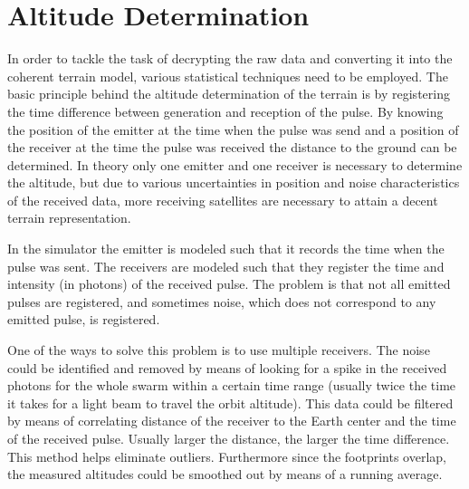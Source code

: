 \section{Altitude Determination}
\label{altDet}
In order to tackle the task of decrypting the raw data and converting it into the coherent terrain model, various statistical techniques need to be employed. The basic principle behind the altitude determination of the terrain is by registering the time difference between generation and reception of the pulse. By knowing the position of the emitter at the time when the pulse was send and a position of the receiver at the time the pulse was received the distance to the ground can be determined. In theory only one emitter and one receiver is necessary to determine the altitude, but due to various uncertainties in position and noise characteristics of the received data, more receiving satellites are necessary to attain a decent terrain representation. 

In the simulator the emitter is modeled such that it records the time when the pulse was sent. The receivers are modeled such that they register the time and intensity (in photons) of the received pulse. The problem is that not all emitted pulses are registered, and sometimes noise, which does not correspond to any emitted pulse, is registered. 

One of the ways to solve this problem is to use multiple receivers. The noise could be identified and removed by means of looking for a spike in the received photons for the whole swarm within a certain time range (usually twice the time it takes for a light beam to travel the orbit altitude). This data could be filtered by means of correlating distance of the receiver to the Earth center and the time of the received pulse. Usually larger the distance, the larger the time difference. This method helps eliminate outliers.
Furthermore since the footprints overlap, the measured altitudes could be smoothed out by means of a running average. 
